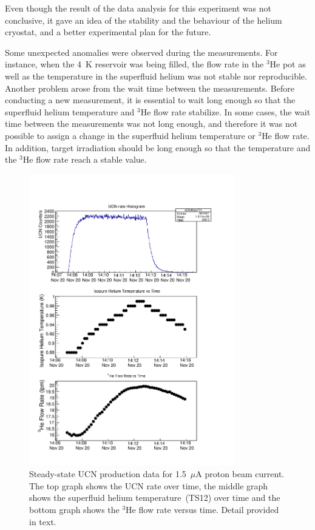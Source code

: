 Even though the result of the data analysis for this experiment was
not conclusive, it gave an idea of the stability and the behaviour of
the helium cryostat, and a better experimental plan for the future.

Some unexpected anomalies were observed during the measurements. For
instance, when the 4~K reservoir was being filled, the flow rate in
the $^3$He pot as well as the temperature in the superfluid helium was
not stable nor reproducible. Another problem arose from the wait time
between the measurements. Before conducting a new measurement, it is
essential to wait long enough so that the superfluid helium
temperature and $^3$He flow rate stabilize. In some
cases, the wait time between the measurements was not long enough, and
therefore it was not possible to assign a change in the superfluid
helium temperature or $^3$He flow rate. In addition, target
irradiation should be long enough so that the temperature and the
$^3$He flow rate reach a stable value.

\begin{figure}[h!]
  \centering \includegraphics[width=0.8\textwidth]{problemrun.pdf}
  \caption[Steady-state UCN production data for 1.5~$\mu$A proton beam
  current]{Steady-state UCN production data for 1.5~$\mu$A proton beam
    current. The top graph shows the UCN rate over time, the middle
    graph shows the superfluid helium temperature~(TS12) over time and
    the bottom graph shows the $^3$He flow rate versus time. Detail
    provided in text.}
\label{fig:problemrun}
\end{figure}

